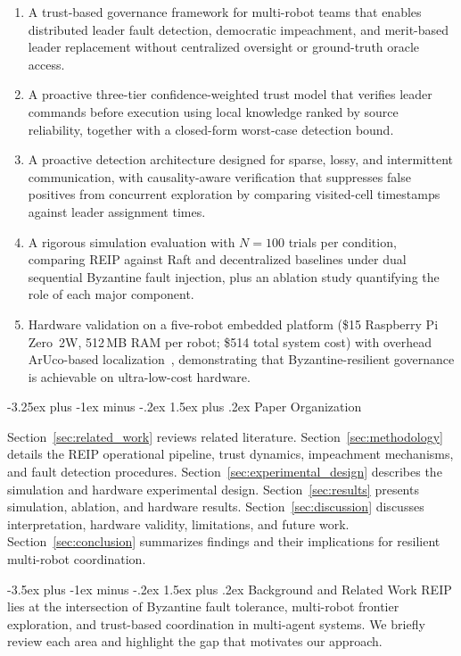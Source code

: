 \documentclass[conference]{IEEEtran}
\makeatletter
\renewcommand{\section}{\@startsection{section}{1}{\z@}%
  {-3.5ex plus -1ex minus -.2ex}%
  {1.5ex plus .2ex}%
  {\normalfont\large\bfseries\centering}}
\renewcommand{\subsection}{\@startsection{subsection}{2}{\z@}%
  {-3.25ex plus -1ex minus -.2ex}%
  {1.5ex plus .2ex}%
  {\normalfont\normalsize\itshape\centering}}
\makeatother
\begin{document}
\begin{enumerate}[leftmargin=*]
    \item A trust-based governance framework for multi-robot teams that enables distributed leader fault detection, democratic impeachment, and merit-based leader replacement without centralized oversight or ground-truth oracle access.
    \item A proactive three-tier confidence-weighted trust model that verifies leader commands before execution using local knowledge ranked by source reliability, together with a closed-form worst-case detection bound.
    \item A proactive detection architecture designed for sparse, lossy, and intermittent communication, with causality-aware verification that suppresses false positives from concurrent exploration by comparing visited-cell timestamps against leader assignment times.
    \item A rigorous simulation evaluation with $N{=}100$ trials per condition, comparing REIP against Raft and decentralized baselines under dual sequential Byzantine fault injection, plus an ablation study quantifying the role of each major component.
    \item Hardware validation on a five-robot embedded platform (\$15 Raspberry Pi Zero~2W, 512\,MB RAM per robot; \$514 total system cost) with overhead ArUco-based localization~\cite{garrido2014aruco}, demonstrating that Byzantine-resilient governance is achievable on ultra-low-cost hardware.
\end{enumerate}

\subsection{Paper Organization}

Section~\ref{sec:related_work} reviews related literature. Section~\ref{sec:methodology} details the REIP operational pipeline, trust dynamics, impeachment mechanisms, and fault detection procedures. Section~\ref{sec:experimental_design} describes the simulation and hardware experimental design. Section~\ref{sec:results} presents simulation, ablation, and hardware results. Section~\ref{sec:discussion} discusses interpretation, hardware validity, limitations, and future work. Section~\ref{sec:conclusion} summarizes findings and their implications for resilient multi-robot coordination.

\section{Background and Related Work}
\label{sec:related_work}
REIP lies at the intersection of Byzantine fault tolerance, multi-robot frontier exploration, and trust-based coordination in multi-agent systems. We briefly review each area and highlight the gap that motivates our approach.
\end{document}
